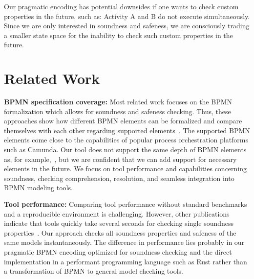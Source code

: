 \documentclass[runningheads]{llncs}
\begin{document}
Our pragmatic encoding has potential downsides if one wants to check custom properties in the future, such as: Activity A and B do not execute simultaneously.
Since we are only interested in soundness and safeness, we are consciously trading a smaller state space for the inability to check such custom properties in the future.

\section{Related Work} \label{sec:related-work}

\textbf{BPMN specification coverage:}
Most related work focuses on the BPMN formalization which allows for soundness and safeness checking.
Thus, these approaches show how different BPMN elements can be formalized and compare themselves with each other regarding supported elements~\cite{corradiniFormalApproachAnalysis2021,houhouFirstOrderLogicVerification2022,krauterFormalizationAnalysisBPMN2023,krauterHigherorderTransformationApproach2023}.
The supported BPMN elements come close to the capabilities of popular process orchestration platforms such as Camunda.
Our tool does not support the same depth of BPMN elements as, for example,~\cite {krauterFormalizationAnalysisBPMN2023}, but we are confident that we can add support for necessary elements in the future.
We focus on tool performance and capabilities concerning soundness, checking comprehension, resolution, and seamless integration into BPMN modeling tools.

\textbf{Tool performance:}
Comparing tool performance without standard benchmarks and a reproducible environment is challenging.
However, other publications indicate that tools quickly take several seconds for checking single soundness properties~\cite{corradiniFormalApproachAnalysis2021,houhouFirstOrderLogicVerification2022,krauterHigherorderTransformationApproach2023}.
Our approach checks all soundness properties and safeness of the same models instantaneously.
The difference in performance lies probably in our pragmatic BPMN encoding optimized for soundness checking and the direct implementation in a performant programming language such as Rust rather than a transformation of BPMN to general model checking tools.
\end{document}

